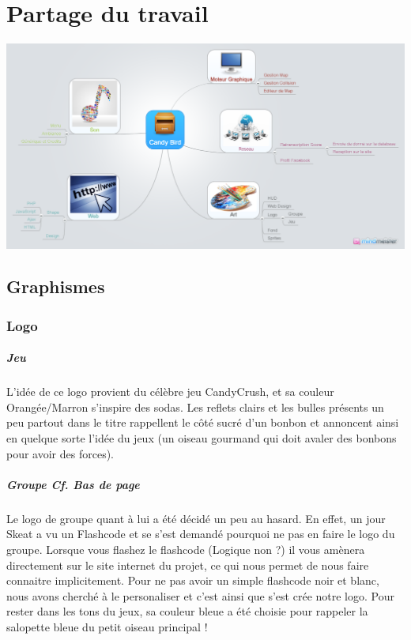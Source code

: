 \documentclass [11pt]{report}
\begin{document}
\newpage 


\chapter {Partage du travail}
\begin{center}
\includegraphics[scale=0.3]{images/Candy_Bird.png}
\end{center}

\newpage 

	


	\section{Graphismes}
		\subsection {Logo}
			\paragraph{Jeu}
				L'idée de ce logo provient du célèbre jeu CandyCrush, et sa couleur Orangée/Marron s'inspire des sodas. Les reflets clairs et les bulles présents un peu partout dans le titre rappellent le côté sucré d'un bonbon et annoncent ainsi en quelque sorte l'idée du jeux (un oiseau gourmand qui doit avaler des bonbons pour 				avoir des forces). \\

			\paragraph{Groupe Cf. Bas de page}
				Le logo de groupe quant à lui a été décidé un peu au hasard. En effet, un jour Skeat a vu un Flashcode et se s'est demandé pourquoi ne pas en faire le logo du groupe. Lorsque vous flashez le flashcode (Logique non ?) il vous amènera directement sur le site internet du projet, ce qui nous permet de nous 				faire connaitre implicitement. Pour ne pas avoir un simple flashcode noir et blanc, nous avons cherché à le personaliser et c'est ainsi que s'est crée notre logo. Pour rester dans les tons du jeux, sa couleur bleue a été choisie pour rappeler la salopette bleue du petit oiseau principal !\\\vspace{5mm}
\end{document}

